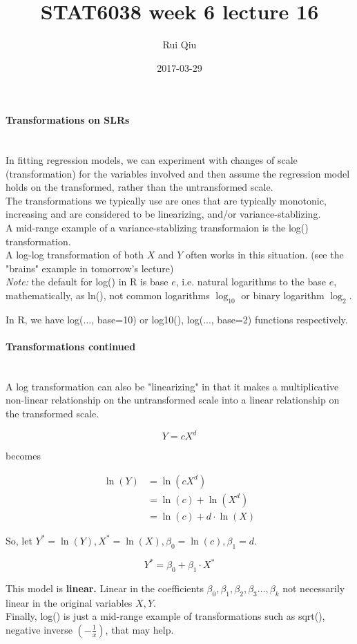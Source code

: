 \documentclass[a4paper, 11pt, twoside]{article}
\begin{document}
\title{STAT6038 week 6 lecture 16}
\author{Rui Qiu}
\date{2017-03-29}

\maketitle

\paragraph{Transformations on SLRs}\ \\

In fitting regression models, we can experiment with changes of scale (transformation) for the variables involved and then assume the regression model holds on the transformed, rather than the untransformed scale.\\

The transformations we typically use are ones that are typically monotonic, increasing and are considered to be linearizing, and/or variance-stablizing.\\

A mid-range example of a variance-stablizing transformaion is the log() transformation.\\

A log-log transformation of both $X$ and $Y$ often works in this situation. (see the "brains" example in tomorrow's lecture)\\

\textit{Note:} the default for log() in R is base $e$, i.e. natural logarithms to the base $e$, mathematically, as ln(), not common logarithms $\log_{10}$ or binary logarithm $\log_2$.

In R, we have log(..., base=10) or log10(), log(..., base=2) functions respectively.\\

\paragraph{Transformations continued}\ \\

A log transformation can also be "linearizing" in that it makes a multiplicative non-linear relationship on the untransformed scale into a linear relationship on the transformed scale.

\[Y = cX^d\]

becomes

\[
\begin{split}
	\ln(Y) &= \ln(cX^d)\\
	&= \ln(c) + \ln(X^d)\\
	&=\ln(c) + d\cdot \ln(X)
\end{split}
\]

So, let $Y^*=\ln(Y), X^*=\ln(X), \beta_0 = \ln(c), \beta_1=d.$

\[Y^* = \beta_0 + \beta_1\cdot X^*\]

This model is \textbf{linear.} Linear in the coefficients $\beta_0, \beta_1, \beta_2, \beta_3\dots, \beta_k$ not necessarily linear in the original variables $X,Y$.\\

Finally, log() is just a mid-range example of transformations such as sqrt(), negative inverse $(-\frac{1}{x})$, that may help.
\end{document}
